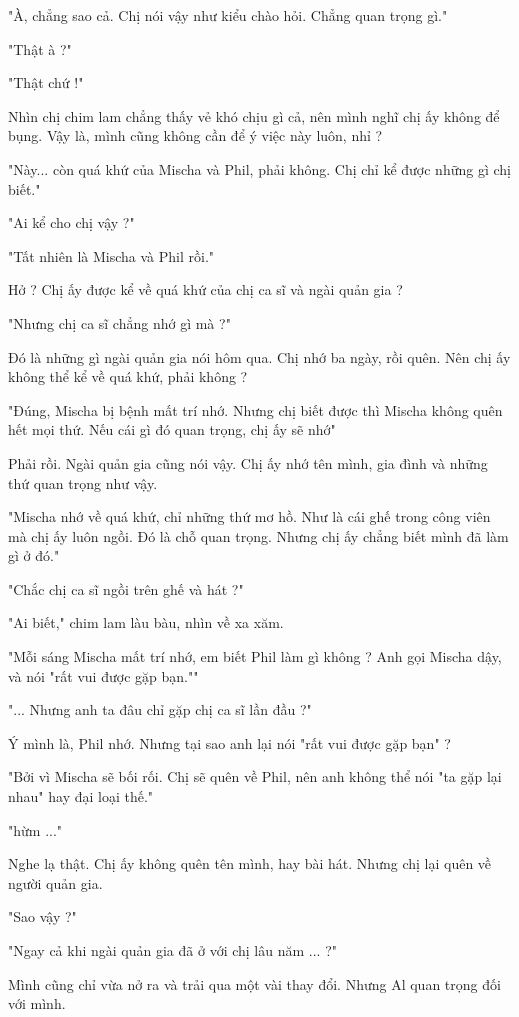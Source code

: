  "À, chẳng sao cả. Chị nói vậy như kiểu chào hỏi. Chẳng quan trọng gì."
 
 "Thật à ?"
 
 "Thật chứ !"
 
 Nhìn chị chim lam chẳng thấy vẻ khó chịu gì cả, nên mình nghĩ chị ấy không để bụng. Vậy là, mình cũng không cần để ý việc này luôn, nhỉ ?
 
 "Này... còn quá khứ của Mischa và Phil, phải không. Chị chỉ kể được những gì chị biết."
 
 "Ai kể cho chị vậy ?"
 
 "Tất nhiên là Mischa và Phil rồi."
 
 Hở ? Chị ấy được kể về quá khứ của chị ca sĩ và ngài quản gia ?
 
 "Nhưng chị ca sĩ chẳng nhớ gì mà ?"
 
 Đó là những gì ngài quản gia nói hôm qua. Chị nhớ ba ngày, rồi quên. Nên chị ấy không thể kể về quá khứ, phải không ?
 
 "Đúng, Mischa bị bệnh mất trí nhớ. Nhưng chị biết được thì Mischa không quên hết mọi thứ. Nếu cái gì đó quan trọng, chị ấy sẽ nhớ"
 
 Phải rồi. Ngài quản gia cũng nói vậy. Chị ấy nhớ tên mình, gia đình và những thứ quan trọng như vậy.
 
 "Mischa nhớ về quá khứ, chỉ những thứ mơ hồ. Như là cái ghế trong công viên mà chị ấy luôn ngồi. Đó là chỗ quan trọng. Nhưng chị ấy chẳng biết mình đã làm gì ở đó."
 
 "Chắc chị ca sĩ ngồi trên ghế và hát ?"
 
 "Ai biết," chim lam làu bàu, nhìn về xa xăm.
 
 "Mỗi sáng Mischa mất trí nhớ, em biết Phil làm gì không ? Anh gọi Mischa dậy, và nói "rất vui được gặp bạn.""
 
 "... Nhưng anh ta đâu chỉ gặp chị ca sĩ lần đầu ?"
 
 Ý mình là, Phil nhớ. Nhưng tại sao anh lại nói "rất vui được gặp bạn" ?
 
 "Bởi vì Mischa sẽ bối rối. Chị sẽ quên về Phil, nên anh không thể nói "ta gặp lại nhau" hay đại loại thế."
 
 "hừm ..."
 
 Nghe lạ thật. Chị ấy không quên tên mình, hay bài hát. Nhưng chị lại quên về người quản gia.
 
 "Sao vậy ?"
 
 "Ngay cả khi ngài quản gia đã ở với chị lâu năm ... ?"
 
 Mình cũng chỉ vừa nở ra và trải qua một vài thay đổi. Nhưng Al quan trọng đối với mình.
 
